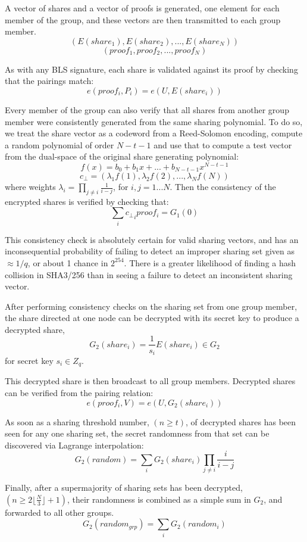 \documentclass[article,oneside]{memoir}
\begin{document}
A vector of shares and a vector of proofs is generated, one element for each member of the group, and these vectors are then transmitted to each group member.
$$(E(share_1), E(share_2), ..., E(share_N))$$
$$ (proof_1, proof_2, ..., proof_N)$$

As with any BLS signature, each share is validated against its proof by checking that the pairings match:
$$ e(proof_i, P_i) = e(U, E(share_i))$$

Every member of the group can also verify that all shares from another group member were consistently generated from the same sharing polynomial. To do so, we treat the share vector as a codeword from a Reed-Solomon encoding\cite{scrape}, compute a random polynomial of order $N - t - 1$ and use that to compute a test vector from the dual-space of the original share generating polynomial:
$$f(x) = b_0 + b_1 x + ... + b_{N-t-1} x^{N-t-1}$$
$$c_{\perp} = (\lambda_1 f(1), \lambda_2 f(2), ... , \lambda_N f(N))$$
where weights $\lambda_i = \prod_{j \ne i} \frac{1}{i-j}$, for $ i,j = 1...N$.
Then the consistency of the encrypted shares is verified by checking that:
$$\sum_i {c_{\perp}}_i proof_i = G_1(0)$$

This consistency check is absolutely certain for valid sharing vectors, and has an inconsequential probability of failing to detect an improper sharing set given as $\approx 1/q$, or about 1 chance in $2^{254}$. There is a greater likelihood of finding a hash collision in SHA3/256 than in seeing a failure to detect an inconsistent sharing vector.

After performing consistency checks on the sharing set from one group member, the share directed at one node can be decrypted with its secret key to produce a decrypted share, $$G_2(share_i) = \frac{1}{s_i}E(share_i) \in G_2$$ for secret key $s_i \in Z_q$.

This decrypted share is then broadcast to all group members. Decrypted shares can be verified from the pairing relation:
$$ e(proof_i, V) = e(U, G_2(share_i))$$

As soon as a sharing threshold number, $(n \ge t)$, of decrypted shares has been seen for any one sharing set, the secret randomness from that set can be discovered via Lagrange interpolation:
$$G_2(random) = \sum_i G_2(share_i) \prod_{j \ne i} \frac{i}{i-j}$$

Finally, after a supermajority of sharing sets has been decrypted, $(n \ge 2 \lfloor \frac{N}{3} \rfloor + 1)$, their randomness is combined as a simple sum in $G_2$, and forwarded to all other groups.
$$G_2(random_{grp}) = \sum_i G_2(random_i)$$
\end{document}
